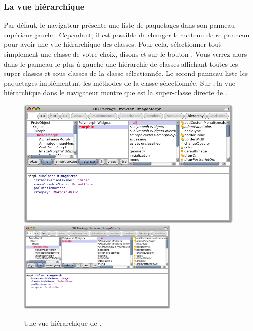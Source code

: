\documentclass[a4paper,10pt,twoside]{book}
\begin{document}
\subsubsection{La vue hiérarchique}

Par défaut, le navigateur présente une liste de paquetages dans son
panneau supérieur gauche.
Cependant, il est possible de changer le contenu de ce panneau pour
avoir une vue hiérarchique des classes. Pour cela, sélectionner tout
simplement une classe de votre choix, disons  et \click
sur le bouton .
Vous verrez alors dans le panneau le plus à gauche une hiérarchie de
classes affichant toutes les super-classes et sous-classes de la
classe sélectionnée.
Le second panneau liste les paquetages implémentant les
méthodes de la classe sélectionnée. %
Sur , la vue hiérarchique dans le navigateur 
montre que  est la super-classe directe de
.

\begin{figure}[btp]
	\begin{center}
   \ifluluelse
		{\includegraphics[width=\textwidth]{hierarchyBrowser}}
		{\includegraphics[width=0.7\textwidth]{hierarchyBrowser}}
	\end{center}
	\caption{Une vue hiérarchique de .}
\end{figure}
\end{document}

